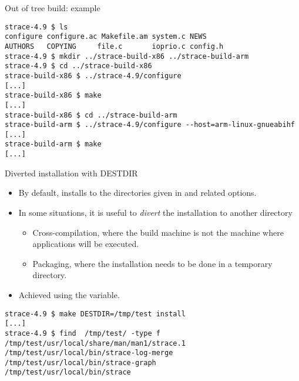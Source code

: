 \begin{frame}[fragile]{Out of tree build: example}

  \begin{block}{}
{\scriptsize
\begin{verbatim}
strace-4.9 $ ls
configure configure.ac Makefile.am system.c NEWS
AUTHORS   COPYING     file.c       ioprio.c config.h
strace-4.9 $ mkdir ../strace-build-x86 ../strace-build-arm
strace-4.9 $ cd ../strace-build-x86
strace-build-x86 $ ../strace-4.9/configure
[...]
strace-build-x86 $ make
[...]
strace-build-x86 $ cd ../strace-build-arm
strace-build-arm $ ../strace-4.9/configure --host=arm-linux-gnueabihf
[...]
strace-build-arm $ make
[...]
\end{verbatim}}
\end{block}

\end{frame}

\begin{frame}[fragile]{Diverted installation with DESTDIR}

  \begin{itemize}

  \item By default,  installs to the directories
    given in  and related options.

  \item In some situations, it is useful to {\em divert} the
    installation to another directory
    \begin{itemize}
    \item Cross-compilation, where the build machine is not the
      machine where applications will be executed.
    \item Packaging, where the installation needs to be done in a
      temporary directory.
    \end{itemize}

  \item Achieved using the  variable.
  \end{itemize}

  \begin{block}{}
{\tiny
\begin{verbatim}
strace-4.9 $ make DESTDIR=/tmp/test install
[...]
strace-4.9 $ find  /tmp/test/ -type f
/tmp/test/usr/local/share/man/man1/strace.1
/tmp/test/usr/local/bin/strace-log-merge
/tmp/test/usr/local/bin/strace-graph
/tmp/test/usr/local/bin/strace
\end{verbatim}}
\end{block}

\end{frame}

